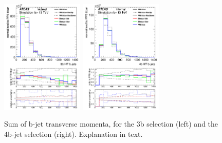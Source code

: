 \begin{figure}[!htb]
\centering
\includegraphics[width=0.35\textwidth]{Plots/ttbb/hisgenHTbjets_4j3t__div}
\includegraphics[width=0.35\textwidth]{Plots/ttbb/hisgenHTbjets_4j4t__div}
  \caption{Sum of b-jet transverse momenta, for the 3b selection (left) and the 4b-jet selection (right). Explanation in text. \label{ttbb:HTbjets}}
\end{figure}

